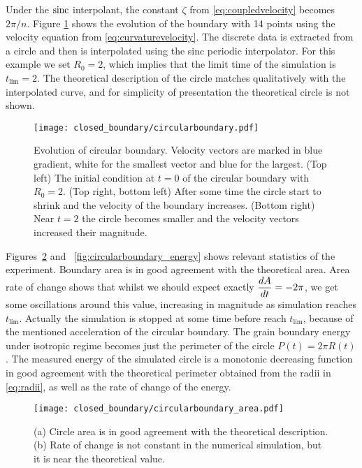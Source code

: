 Under the $\operatorname{sinc}$ interpolant, the constant $\zeta$ from \eqref{eq:coupledvelocity} becomes $2\pi/n$. Figure \ref{fig:circularboundary} shows the evolution of the boundary with 14 points using the velocity equation from \eqref{eq:curvaturevelocity}. The discrete data is extracted from a circle and then is interpolated using the sinc periodic interpolator. For this example we set $R_0 = 2$, which implies that the limit time of the simulation is $t_{\text{lim}}=2$. The theoretical description of the circle matches qualitatively with the interpolated curve, and for simplicity of presentation the theoretical circle is not shown. 

\begin{figure}[t]
    \centering
    \texttt{[image: closed\_boundary/circularboundary.pdf]}
    \caption[Circular boundary evolution]{Evolution of circular boundary. Velocity vectors are marked in blue gradient, white for the smallest vector and blue for the largest. (Top left) The initial condition at $t=0$ of the circular boundary with $R_0 = 2$. (Top right, bottom left) After some time the circle start to shrink and the velocity of the boundary increases. (Bottom right) Near $t=2$ the circle becomes smaller and the velocity vectors increased their magnitude.}
    \label{fig:circularboundary}
\end{figure}

Figures~\ref{fig:circularboundary_area} and ~\ref{fig:circularboundary_energy} shows relevant statistics of the experiment. Boundary area is in good agreement with the theoretical area. Area rate of change shows that whilst we should expect exactly $\dfrac{dA}{dt} = -2\pi$, we get some oscillations around this value, increasing in magnitude as simulation reaches $t_{\text{lim}}$. Actually the simulation is stopped at some time before reach $t_{\text{lim}}$, because of the mentioned acceleration of the circular boundary. The grain boundary energy under isotropic regime becomes just the perimeter of the circle $P(t) = 2\pi R(t)$. The measured energy of the simulated circle is a monotonic decreasing function in good agreement with the theoretical perimeter obtained from the radii in \eqref{eq:radii}, as well as the rate of change of the energy. 

\begin{figure}[t]
    \centering
    \texttt{[image: closed\_boundary/circularboundary\_area.pdf]}
    \subfloat[\label{fig:area}]{\hspace{.55\linewidth}}
    \subfloat[\label{fig:dAdt}]{\hspace{.45\linewidth}}
    \caption[Circular boundary area and rate of change]{(a) Circle area is in good agreement with the theoretical description. (b) Rate of change is not constant in the numerical simulation, but it is near the theoretical value.}
    \label{fig:circularboundary_area}
\end{figure}

